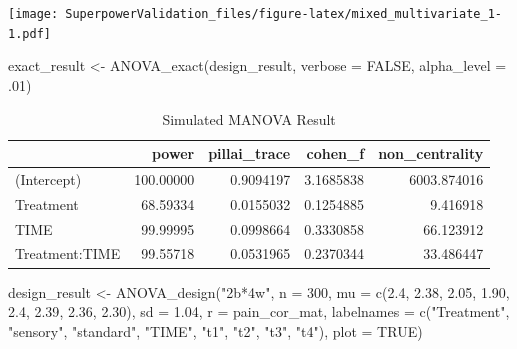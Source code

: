 \documentclass[
]{book}
\newenvironment{Shaded}{\begin{snugshade}}{\end{snugshade}}
\newcommand{\AttributeTok}[1]{\textcolor[rgb]{0.77,0.63,0.00}{#1}}
\newcommand{\ConstantTok}[1]{\textcolor[rgb]{0.00,0.00,0.00}{#1}}
\newcommand{\DecValTok}[1]{\textcolor[rgb]{0.00,0.00,0.81}{#1}}
\newcommand{\FloatTok}[1]{\textcolor[rgb]{0.00,0.00,0.81}{#1}}
\newcommand{\FunctionTok}[1]{\textcolor[rgb]{0.00,0.00,0.00}{#1}}
\newcommand{\NormalTok}[1]{#1}
\newcommand{\OtherTok}[1]{\textcolor[rgb]{0.56,0.35,0.01}{#1}}
\newcommand{\StringTok}[1]{\textcolor[rgb]{0.31,0.60,0.02}{#1}}
\begin{document}
\texttt{[image: SuperpowerValidation\_files/figure-latex/mixed\_multivariate\_1-1.pdf]}

\begin{Shaded}
\begin{Highlighting}[]
\NormalTok{exact\_result }\OtherTok{\textless{}{-}} \FunctionTok{ANOVA\_exact}\NormalTok{(design\_result, }\AttributeTok{verbose =} \ConstantTok{FALSE}\NormalTok{,}
                            \AttributeTok{alpha\_level =}\NormalTok{ .}\DecValTok{01}\NormalTok{)}
\end{Highlighting}
\end{Shaded}

\begin{table}[!h]

\caption{\label{tab:unnamed-chunk-167}Simulated MANOVA Result}
\centering
\begin{tabular}[t]{l|r|r|r|r}
\hline
  & power & pillai\_trace & cohen\_f & non\_centrality\\
\hline
(Intercept) & 100.00000 & 0.9094197 & 3.1685838 & 6003.874016\\
\hline
Treatment & 68.59334 & 0.0155032 & 0.1254885 & 9.416918\\
\hline
TIME & 99.99995 & 0.0998664 & 0.3330858 & 66.123912\\
\hline
Treatment:TIME & 99.55718 & 0.0531965 & 0.2370344 & 33.486447\\
\hline
\end{tabular}
\end{table}

\begin{Shaded}
\begin{Highlighting}[]
\NormalTok{design\_result }\OtherTok{\textless{}{-}} \FunctionTok{ANOVA\_design}\NormalTok{(}\StringTok{"2b*4w"}\NormalTok{,}
                              \AttributeTok{n =} \DecValTok{300}\NormalTok{,}
                              \AttributeTok{mu =} \FunctionTok{c}\NormalTok{(}\FloatTok{2.4}\NormalTok{, }\FloatTok{2.38}\NormalTok{, }\FloatTok{2.05}\NormalTok{, }\FloatTok{1.90}\NormalTok{,}
                                     \FloatTok{2.4}\NormalTok{, }\FloatTok{2.39}\NormalTok{, }\FloatTok{2.36}\NormalTok{, }\FloatTok{2.30}\NormalTok{),}
                              \AttributeTok{sd =} \FloatTok{1.04}\NormalTok{,}
                              \AttributeTok{r =}\NormalTok{ pain\_cor\_mat,}
                              \AttributeTok{labelnames =} \FunctionTok{c}\NormalTok{(}\StringTok{"Treatment"}\NormalTok{, }\StringTok{"sensory"}\NormalTok{, }\StringTok{"standard"}\NormalTok{,}
                                             \StringTok{"TIME"}\NormalTok{, }\StringTok{"t1"}\NormalTok{, }\StringTok{"t2"}\NormalTok{, }\StringTok{"t3"}\NormalTok{, }\StringTok{"t4"}\NormalTok{),}
                              \AttributeTok{plot =} \ConstantTok{TRUE}\NormalTok{)}
\end{Highlighting}
\end{Shaded}
\end{document}
